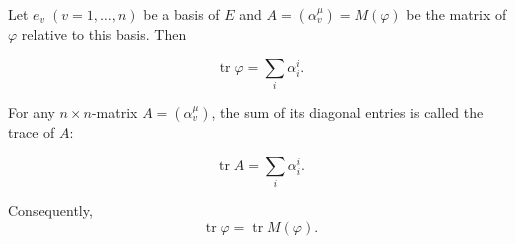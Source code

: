Let $e_v\;(v = 1, \ldots, n)$ be a basis of $E$ and $A = (\alpha_v^\mu) = M(\varphi)$ be the matrix of $\varphi$ relative to this basis. Then

$$\operatorname{tr} \varphi = \sum_i \alpha_i^i.$$

For any $n \times n$-matrix $A = (\alpha_v^\mu)$, the sum of its diagonal entries is called the trace of $A$:

$$\operatorname{tr} A = \sum_i \alpha_i^i.$$

Consequently,
$$\operatorname{tr} \varphi = \operatorname{tr} M(\varphi).$$
